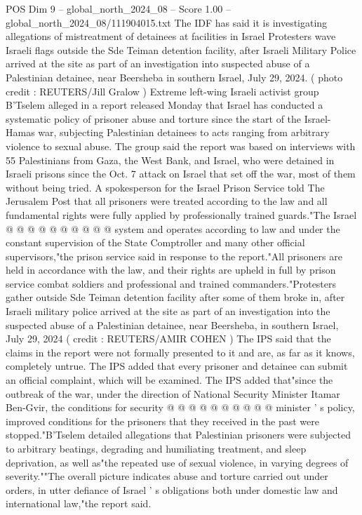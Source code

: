 \begin{textsample}{POS Dim 9 – global\_north\_2024\_08 – Score 1.00 – global\_north\_2024\_08/111904015.txt}  \label{ex:f9_pos_363}
The IDF has said it is investigating allegations of mistreatment of detainees at facilities in Israel Protesters wave Israeli flags outside the Sde Teiman detention facility, after Israeli Military Police arrived at the site as part of an investigation into suspected abuse of a Palestinian detainee, near Beersheba in southern Israel, July 29, 2024. ( photo credit : REUTERS/Jill Gralow ) Extreme left-wing Israeli activist group B'Tselem alleged in a report released Monday that Israel has conducted a systematic policy of prisoner abuse and torture since the start of the Israel-Hamas war, subjecting Palestinian detainees to acts ranging from arbitrary violence to sexual abuse.
The group said the report was based on interviews with 55 Palestinians from Gaza, the West Bank, and Israel, who were detained in Israeli prisons since the Oct. 7 attack on Israel that set off the war, most of them without being tried.
A spokesperson for the Israel Prison Service told The Jerusalem Post that all prisoners were treated according to the law and all fundamental rights were fully applied by professionally trained guards."The Israel @ @ @ @ @ @ @ @ @ @ system and operates according to law and under the constant supervision of the State Comptroller and many other official supervisors,"the prison service said in response to the report."All prisoners are held in accordance with the law, and their rights are upheld in full by prison service combat soldiers and professional and trained commanders."Protesters gather outside Sde Teiman detention facility after some of them broke in, after Israeli military police arrived at the site as part of an investigation into the suspected abuse of a Palestinian detainee, near Beersheba, in southern Israel, July 29, 2024 ( credit : REUTERS/AMIR COHEN ) The IPS said that the claims in the report were not formally presented to it and are, as far as it knows, completely untrue.
The IPS added that every prisoner and detainee can submit an official complaint, which will be examined.
The IPS added that"since the outbreak of the war, under the direction of National Security Minister Itamar Ben-Gvir, the conditions for security @ @ @ @ @ @ @ @ @ @ minister ' s policy, improved conditions for the prisoners that they received in the past were stopped."B'Tselem detailed allegations that Palestinian prisoners were subjected to arbitrary beatings, degrading and humiliating treatment, and sleep deprivation, as well as"the repeated use of sexual violence, in varying degrees of severity.""The overall picture indicates abuse and torture carried out under orders, in utter defiance of Israel ' s obligations both under domestic law and international law,"the report said.

\end{textsample}
